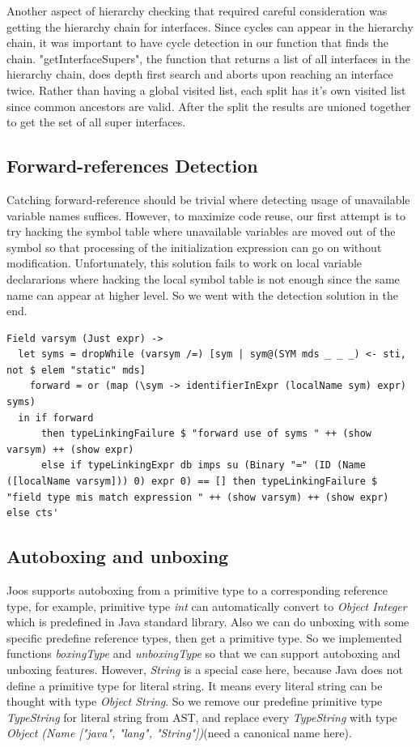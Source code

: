 \documentclass[12pt,letterpaper]{article}
\begin{document}
Another aspect of hierarchy checking that required careful consideration was getting the hierarchy chain for interfaces.
Since cycles can appear in the hierarchy chain, it was important to have cycle detection in our function that finds the chain.
"getInterfaceSupers", the function that returns a list of all interfaces in the hierarchy chain, does depth first search and aborts upon reaching an interface twice.
Rather than having a global visited list, each split has it's own visited list since common ancestors are valid.
After the split the results are unioned together to get the set of all super interfaces.

\subsection{Forward-references Detection}
Catching forward-reference should be trivial where detecting usage of unavailable variable names suffices. However, to maximize code reuse, our first attempt is to try hacking the symbol table where unavailable variables are moved out of the symbol so that processing of the initialization expression can go on without modification. Unfortunately, this solution fails to work on local variable declararions where hacking the local symbol table is not enough since the same name can appear at higher level. So we went with the detection solution in the end.
\begin{lstlisting}
Field varsym (Just expr) ->
  let syms = dropWhile (varsym /=) [sym | sym@(SYM mds _ _ _) <- sti, not $ elem "static" mds]
    forward = or (map (\sym -> identifierInExpr (localName sym) expr) syms)
  in if forward
      then typeLinkingFailure $ "forward use of syms " ++ (show varsym) ++ (show expr)
      else if typeLinkingExpr db imps su (Binary "=" (ID (Name ([localName varsym])) 0) expr 0) == [] then typeLinkingFailure $ "field type mis match expression " ++ (show varsym) ++ (show expr) else cts'
\end{lstlisting}

\subsection{Autoboxing and unboxing}
Joos supports autoboxing from a primitive type to a corresponding reference type, for example, primitive type \emph{int} can automatically convert to \emph{Object Integer} which is predefined in Java standard library.
Also we can do unboxing with some specific predefine reference types, then get a primitive type.
So we implemented functions \emph{boxingType} and \emph{unboxingType} so that we can support autoboxing and unboxing features.
However, \emph{String} is a special case here, because Java does not define a primitive type for literal string.
It means every literal string can be thought with type \emph{Object String}.
So we remove our predefine primitive type \emph{TypeString} for literal string from AST, and replace every \emph{TypeString} with type \emph{Object (Name ["java", "lang", "String"])}(need a canonical name here).
\end{document}

